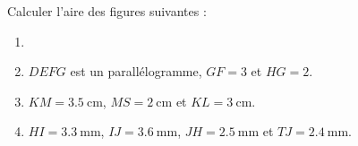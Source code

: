 
\begin{exercice}\label{exo2smath-0265}

    Calculer l'aire des figures suivantes :
    \begin{enumerate}
        \item
\begin{center}
   
\end{center}
\item
    \( DEFG\) est un parallélogramme, \( GF=3\) et \( HG=2\).
\begin{center}
   
\end{center}
\item
    \( KM=\SI{3.5}{\centi\meter}\), \( MS=\SI{2}{\centi\meter}\) et \( KL=\SI{3}{\centi\meter}\).
\begin{center}
   
\end{center}
\item
    \( HI=\SI{3.3}{\milli\meter}\), \( IJ=\SI{3.6}{\milli\meter}\), \( JH=\SI{2.5}{\milli\meter}\) et \( TJ=\SI{2.4}{\milli\meter}\).
\begin{center}
   
\end{center}

    \end{enumerate}

\end{exercice}
